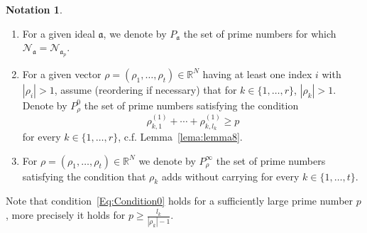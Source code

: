 \documentclass[12pt]{amsart}
\theoremstyle{definition}
\newtheorem{notation}[theorem]{Notation}
\numberwithin{equation}{subsection}
\DeclareMathOperator{\fpt}{fpt}
\newcommand{\RR}{\mathbb{R}}
\newcommand{\fa}{\mathfrak{a}}
\newcommand{\SP}{\mathcal{P}}
\newcommand{\N}{\mathcal{N}}
\newcommand{\Bf}{\boldsymbol{f}}
\renewcommand{\!}[1]{{\color{red}\text{\Huge$\star$ }#1}}
\begin{document}
\begin{notation}\label{Notation}
	\begin{enumerate}
		\item For a given ideal $\fa$, we denote by $P_\fa$ the set of prime numbers for which  $\N_{\fa}=\N_{\fa_p}$.
		\item For a given vector $\rho=(\rho_1, \ldots, \rho_t)\in \RR^N$ having at least one index $i$ with $|\rho_i|>1$, assume (reordering if necessary) that for $k\in \{1,\ldots,r\}$, $|\rho_k|>1$. Denote by $P_\rho^0$ the set of prime numbers satisfying the condition 
		\begin{equation}\label{Eq:Condition0}
			\rho_{k,1}^{(1)}+ \cdots + \rho_{k,l_{k}}^{(1)} \geq p
		\end{equation} 
		for every $k\in\{1,\ldots,r\}$, c.f. Lemma~\ref{lema:lemma8}.
		\item For $\rho=(\rho_1, \ldots, \rho_t)\in \RR^N$ we denote by $P_\rho^\infty$ the set of prime numbers satisfying the condition that $\rho_k$ adds without carrying for every $k\in\{1,\ldots,t\}$.
	\end{enumerate}
\end{notation}
Note that condition~\ref{Eq:Condition0} holds for a sufficiently large prime number $p$, more precisely it holds for $p\geq \frac{l_k}{|\rho_k|-1}$. 
\end{document}
